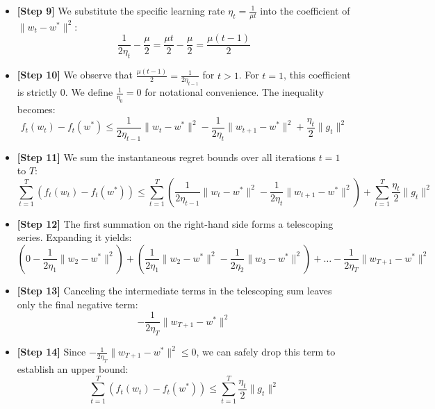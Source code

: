 \documentclass[12pt]{article}
\begin{document}
\begin{itemize}
    \item \textbf{[Step 9]} We substitute the specific learning rate $\eta_t = \frac{1}{\mu t}$ into the coefficient of $\|w_t - w^*\|^2$:
    $$\frac{1}{2\eta_t} - \frac{\mu}{2} = \frac{\mu t}{2} - \frac{\mu}{2} = \frac{\mu (t-1)}{2}$$
    
    \item \textbf{[Step 10]} We observe that $\frac{\mu (t-1)}{2} = \frac{1}{2\eta_{t-1}}$ for $t > 1$. For $t=1$, this coefficient is strictly $0$. We define $\frac{1}{\eta_0} = 0$ for notational convenience. The inequality becomes:
    $$f_t(w_t) - f_t(w^*) \leq \frac{1}{2\eta_{t-1}} \|w_t - w^*\|^2 - \frac{1}{2\eta_t} \|w_{t+1} - w^*\|^2 + \frac{\eta_t}{2} \|g_t\|^2$$
    
    \item \textbf{[Step 11]} We sum the instantaneous regret bounds over all iterations $t = 1$ to $T$:
    $$\sum_{t=1}^T (f_t(w_t) - f_t(w^*)) \leq \sum_{t=1}^T \left( \frac{1}{2\eta_{t-1}} \|w_t - w^*\|^2 - \frac{1}{2\eta_t} \|w_{t+1} - w^*\|^2 \right) + \sum_{t=1}^T \frac{\eta_t}{2} \|g_t\|^2$$
    
    \item \textbf{[Step 12]} The first summation on the right-hand side forms a telescoping series. Expanding it yields:
    $$\left( 0 - \frac{1}{2\eta_1} \|w_2 - w^*\|^2 \right) + \left( \frac{1}{2\eta_1} \|w_2 - w^*\|^2 - \frac{1}{2\eta_2} \|w_3 - w^*\|^2 \right) + \dots - \frac{1}{2\eta_T} \|w_{T+1} - w^*\|^2$$
    
    \item \textbf{[Step 13]} Canceling the intermediate terms in the telescoping sum leaves only the final negative term:
    $$- \frac{1}{2\eta_T} \|w_{T+1} - w^*\|^2$$
    
    \item \textbf{[Step 14]} Since $- \frac{1}{2\eta_T} \|w_{T+1} - w^*\|^2 \leq 0$, we can safely drop this term to establish an upper bound:
    $$\sum_{t=1}^T (f_t(w_t) - f_t(w^*)) \leq \sum_{t=1}^T \frac{\eta_t}{2} \|g_t\|^2$$
\end{itemize}
\end{document}
